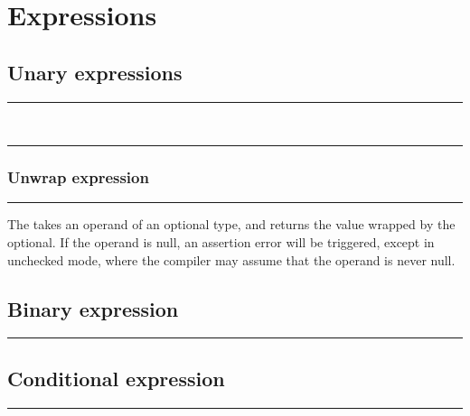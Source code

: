 
\chapter{Expressions}

\section{Unary expressions}

\begin{grammar}
\rule{prefix-unary-expression}  \\
\rule{postfix-unary-expression}  
\end{grammar}

\subsection{Unwrap expression}

\begin{grammar}
\rule{unwrap-expression}  \code{!}
\end{grammar}

The  takes an operand of an optional type, and
returns the value wrapped by the optional. If the operand is null, an assertion
error will be triggered, except in unchecked mode, where the compiler may assume
that the operand is never null.

\section{Binary expression}

\begin{grammar}
\rule{binary-expression}   
\end{grammar}

\section{Conditional expression}

\begin{grammar}
\rule{conditional-expression}    \code{:} 
\end{grammar}

